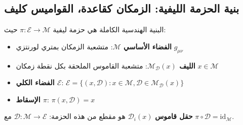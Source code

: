 \documentclass[11pt,a4paper]{article}
\begin{document}
	\subsection{بنية الحزمة الليفية: الزمكان كقاعدة، القواميس كليف}
	البنية الهندسية الكاملة هي حزمة ليفية $\pi: \mathcal{E} \to \mathcal{M}$ حيث:
	\begin{itemize}
		\item \textbf{الفضاء الأساسي $\mathcal{M}$}: متشعبة الزمكان بمتري لورنتزي $g_{\mu\nu}$
		\item \textbf{الليف $\mathcal{M}_{\mathcal{D}}(x)$}: متشعبة القاموس الملحقة بكل نقطة زمكان $x \in \mathcal{M}$
		\item \textbf{الفضاء الكلي $\mathcal{E}$}: $\mathcal{E} = \{(x, \mathcal{D}) : x \in \mathcal{M}, \mathcal{D} \in \mathcal{M}_{\mathcal{D}}(x)\}$
		\item \textbf{الإسقاط $\pi$}: $\pi(x, \mathcal{D}) = x$
	\end{itemize}
	
	\textbf{حقل قاموس} $\mathcal{D}_i(x)$ هو مقطع من هذه الحزمة: $\mathcal{D}: \mathcal{M} \to \mathcal{E}$ مع $\pi \circ \mathcal{D} = \text{id}_{\mathcal{M}}$.
	
\end{document}
